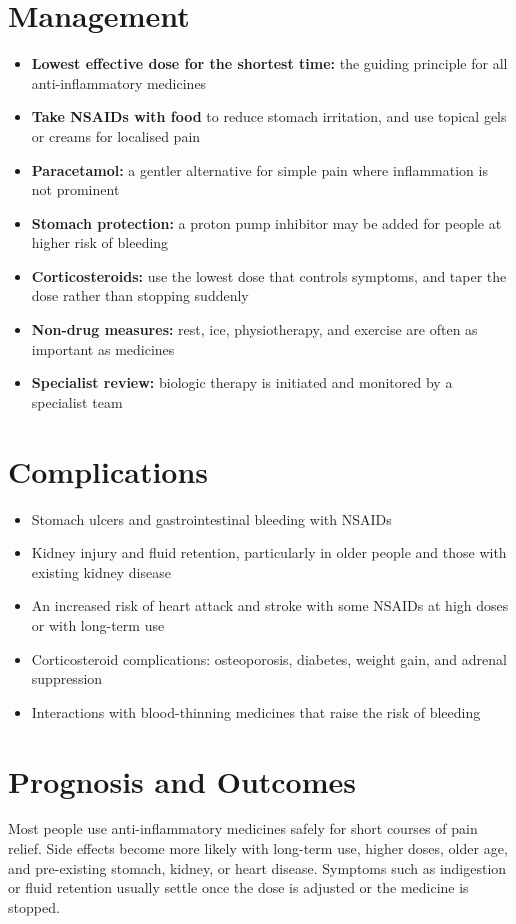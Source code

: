 \section*{Management}
\begin{itemize}
    \item \textbf{Lowest effective dose for the shortest time:} the guiding principle for all anti-inflammatory medicines
    \item \textbf{Take NSAIDs with food} to reduce stomach irritation, and use topical gels or creams for localised pain
    \item \textbf{Paracetamol:} a gentler alternative for simple pain where inflammation is not prominent
    \item \textbf{Stomach protection:} a proton pump inhibitor may be added for people at higher risk of bleeding
    \item \textbf{Corticosteroids:} use the lowest dose that controls symptoms, and taper the dose rather than stopping suddenly
    \item \textbf{Non-drug measures:} rest, ice, physiotherapy, and exercise are often as important as medicines
    \item \textbf{Specialist review:} biologic therapy is initiated and monitored by a specialist team
\end{itemize}

\section*{Complications}
\begin{itemize}
    \item Stomach ulcers and gastrointestinal bleeding with NSAIDs
    \item Kidney injury and fluid retention, particularly in older people and those with existing kidney disease
    \item An increased risk of heart attack and stroke with some NSAIDs at high doses or with long-term use
    \item Corticosteroid complications: osteoporosis, diabetes, weight gain, and adrenal suppression
    \item Interactions with blood-thinning medicines that raise the risk of bleeding
\end{itemize}

\section*{Prognosis and Outcomes}
Most people use anti-inflammatory medicines safely for short courses of pain relief. Side effects become more likely with long-term use, higher doses, older age, and pre-existing stomach, kidney, or heart disease. Symptoms such as indigestion or fluid retention usually settle once the dose is adjusted or the medicine is stopped.

